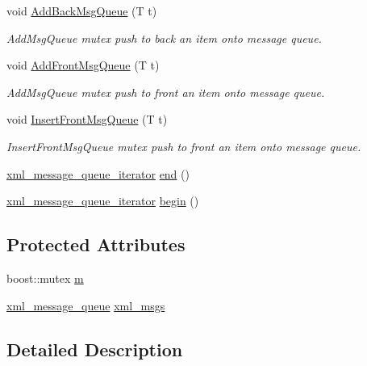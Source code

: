 \begin{DoxyCompactItemize}
void \hyperlink{classRCS_1_1CMessageQueue_a975b0dc0f762f129fb6bd9297cbb3a3d}{Add\-Back\-Msg\-Queue} (T t)
\begin{DoxyCompactList}\small\item\em Add\-Msg\-Queue mutex push to back an item onto message queue. \end{DoxyCompactList}\item 
void \hyperlink{classRCS_1_1CMessageQueue_a4da04a657574f94d654898fd0bfc5983}{Add\-Front\-Msg\-Queue} (T t)
\begin{DoxyCompactList}\small\item\em Add\-Msg\-Queue mutex push to front an item onto message queue. \end{DoxyCompactList}\item 
void \hyperlink{classRCS_1_1CMessageQueue_ab9a9aa2c8e05c74bd0b67dc2b576850f}{Insert\-Front\-Msg\-Queue} (T t)
\begin{DoxyCompactList}\small\item\em Insert\-Front\-Msg\-Queue mutex push to front an item onto message queue. \end{DoxyCompactList}\item 
\hyperlink{classRCS_1_1CMessageQueue_aa229add119e43aa53229252b6dffb691}{xml\-\_\-message\-\_\-queue\-\_\-iterator} \hyperlink{classRCS_1_1CMessageQueue_ae8f0f317fd57acac619797badad88be2}{end} ()
\item 
\hyperlink{classRCS_1_1CMessageQueue_aa229add119e43aa53229252b6dffb691}{xml\-\_\-message\-\_\-queue\-\_\-iterator} \hyperlink{classRCS_1_1CMessageQueue_aba32094584981f8b425660cb3ee4cf50}{begin} ()
\end{DoxyCompactItemize}
\subsection*{Protected Attributes}
\begin{DoxyCompactItemize}
\item 
boost\-::mutex \hyperlink{classRCS_1_1CMessageQueue_a874fdf08657e4ca2da89168bb6176c49}{m}
\item 
\hyperlink{classRCS_1_1CMessageQueue_a272ec6240c0ae616f66e71a033326e28}{xml\-\_\-message\-\_\-queue} \hyperlink{classRCS_1_1CMessageQueue_aa699f0b2f9f057242c5f0d3882f14ecb}{xml\-\_\-msgs}
\end{DoxyCompactItemize}


\subsection{Detailed Description}
